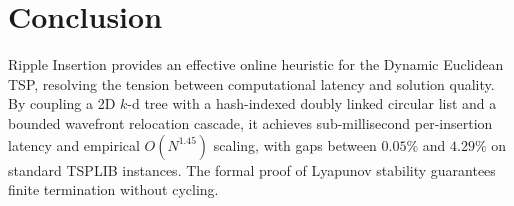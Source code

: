 \documentclass{article}
\theoremstyle{definition}
\begin{document}
\section{Conclusion}

Ripple Insertion provides an effective online heuristic for the Dynamic Euclidean TSP, resolving the tension between computational latency and solution quality. By coupling a 2D $k$-d tree with a hash-indexed doubly linked circular list and a bounded wavefront relocation cascade, it achieves sub-millisecond per-insertion latency and empirical $O(N^{1.45})$ scaling, with gaps between $0.05\%$ and $4.29\%$ on standard TSPLIB instances. The formal proof of Lyapunov stability guarantees finite termination without cycling.



\end{document}
